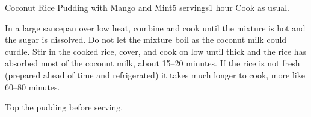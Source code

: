 \documentclass[../Cookbook.tex]{subfiles}
\begin{document}
\begin{recipe}[CoconutRicePudding]{Coconut Rice Pudding with Mango and Mint}{5 servings}{1 hour}
	Cook as usual.

	In a large saucepan over low heat, combine and cook until the mixture is hot and the sugar is dissolved. Do not let the mixture boil as the coconut milk could curdle.
	Stir in the cooked rice, cover, and cook on low until thick and the rice has absorbed most of the coconut milk, about 15--20 minutes.
	If the rice is not fresh (prepared ahead of time and refrigerated) it takes much longer to cook, more like 60--80 minutes.

	Top the pudding before serving.
\end{recipe}
\end{document}
